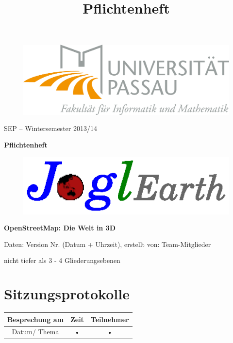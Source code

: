 \documentclass[10pt]{report}
\begin{document}
\title{Pflichtenheft}
\begin{figure}
	\begin{flushright}
		\includegraphics[scale=0.5]{uniLogo.png}
	\end{flushright}
\end{figure}
\begin{center}
\vspace{2.0 cm}
{\LARGE SEP – Wintersemester 2013/14}

\vspace{1.0 cm}
\textbf{{\Huge Pflichtenheft}}

\vspace{0.5 cm}
\begin{figure}[!htb]
\begin{center}
	\includegraphics[scale=1.0]{projektLogo.eps}
\end{center}
\end{figure}



\vspace{0.5 cm}
\textbf{{\Huge OpenStreetMap: Die Welt in 3D}}






\end{center}
Daten: Version Nr. (Datum + Uhrzeit), erstellt von: Team-Mitglieder

\tableofcontents

nicht tiefer als 3 - 4 Gliederungsebenen

\chapter{Sitzungsprotokolle}
\begin{tabular}{|c|c|c|}
\hline 
Besprechung am  & Zeit & Teilnehmer \\ 
\hline 
Datum/ Thema & • & • \\ 
\hline 
\end{tabular} 
\end{document}
